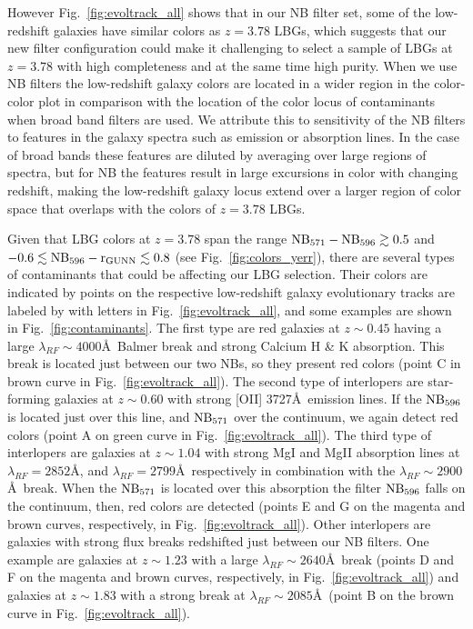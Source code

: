 \documentclass[iop, revtex4]{emulateapj}
\begin{document}
However Fig.~\ref{fig:evoltrack_all} shows that in our NB filter set,
some of the low-redshift
galaxies have similar colors as $z=3.78$ LBGs, which suggests that our new
filter configuration could make it challenging to
select a sample of LBGs at $z=3.78$ with high completeness and at the same time high
purity. 
When we use NB filters the low-redshift galaxy colors are located in a wider region in the
color-color plot in comparison with the location of the color locus of contaminants
when broad band filters are used. We attribute this to sensitivity of the NB filters
to features in the galaxy spectra such as emission or absorption lines. In the case of
broad bands these features are diluted by averaging over large regions of spectra, but for
NB
the features result in large excursions in color with changing
redshift, making the low-redshift galaxy locus extend over a larger
region of color space that overlaps with the colors of $z=3.78$ LBGs.

Given that LBG colors at $z=3.78$ span the range $\rm
NB_{571}-NB_{596} \gtrsim 0.5$ and $-0.6 \lesssim \rm
NB_{596}-r_{GUNN} \lesssim 0.8$ (see Fig.~\ref{fig:colors_yerr}),
there are several types of contaminants that could be affecting our
LBG selection. Their colors are indicated by points on the
respective low-redshift galaxy evolutionary tracks
are labeled by with letters in
Fig.~\ref{fig:evoltrack_all}, and some examples are shown in
Fig.~\ref{fig:contaminants}. The first type are red galaxies at
$z\sim0.45$ having a large $\lambda_{RF}\sim4000$\AA\, Balmer break
and strong Calcium H \& K absorption. This break is located just
between our two NBs, so they present red colors (point C in
brown curve in Fig.~\ref{fig:evoltrack_all}).
The second type of interlopers are star-forming
galaxies at $z\sim0.60$ with strong [OII] 3727\AA\, emission
lines. If the $\rm NB_{596}$ is located just over this line, and $\rm
NB_{571}$ over the continuum,
we again detect red colors (point A on green curve in 
Fig.~\ref{fig:evoltrack_all}). The third type of interlopers are
galaxies at $z\sim1.04$ with strong MgI and MgII absorption lines at
$\lambda_{RF}=2852$\AA, and $\lambda_{RF}=2799$\AA\, respectively in
combination with the $\lambda_{RF}\sim2900$\AA\, break. When the $\rm
NB_{571}$ is located over this absorption the filter $\rm NB_{596}$
falls on the continuum, then, red colors are detected (points E and G
on the magenta and brown curves, respectively, in Fig.~\ref{fig:evoltrack_all}). Other
interlopers are galaxies with
strong flux breaks redshifted just between our NB
filters. One example are galaxies at $z\sim1.23$ with a large
$\lambda_{RF}\sim2640$\AA\, break (points D and F on the
magenta and brown curves, respectively, in Fig.~\ref{fig:evoltrack_all}) and galaxies at
$z\sim1.83$ with a strong break at $\lambda_{RF}\sim2085$\AA\, (point B on the
brown curve in Fig.~\ref{fig:evoltrack_all}).
\end{document}
